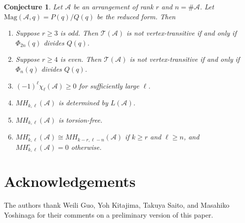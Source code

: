 \documentclass{amsart}
\numberwithin{equation}{section}
\newtheorem{conj}[thm]{Conjecture}
\theoremstyle{plain}
\theoremstyle{remark}
\theoremstyle{definition}
\numberwithin{equation}{section}
\newcommand{\A}{\mathcal{A}}
\newcommand{\T}{\mathcal{T}}
\newcommand{\Mag}{\mathrm{Mag}}
\begin{document}
\begin{conj}
    Let $\A$ be an arrangement of rank $r$ and $n=\#\A$. Let $\Mag(\A,q)=P(q)/Q(q)$ be the reduced form. Then 
    \begin{enumerate}
        \item Suppose $r\geq 3$ is odd. Then $\T(\A)$ is not vertex-transitive if and only if $\Phi_{2n}(q)$ divides $Q(q)$.
        \item Suppose $r\geq 4$ is even. Then $\T(\A)$ is not vertex-transitive if and only if $\Phi_n(q)$ divides $Q(q)$.
        \item $(-1)^{\ell}\chi_\ell(\A)\geq0$ for sufficiently large $\ell$.
        \item $MH_{k,\ell}(\A)$ is determined by $L(\A)$.
        \item $MH_{k,\ell}(\A)$ is torsion-free.
        \item $MH^\circ_{k,\ell}(\A)\cong MH_{k-r,\ell-n}(\A)$ if $k\geq r$ and $\ell\geq n$, and $MH^\circ_{k,\ell}(\A)=0$ otherwise.
    \end{enumerate}
\end{conj}


\section*{Acknowledgements}
The authors thank Weili Guo, Yoh Kitajima, Takuya Saito, and Masahiko Yoshinaga for their comments on a preliminary version of this paper.



\appendix
\end{document}
